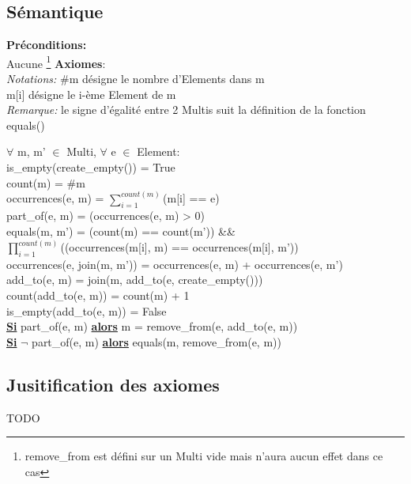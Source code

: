 \documentclass[a4paper, 11pt, oneside]{article}
\begin{document}
	\subsection{Sémantique}
	\noindent \textbf{Préconditions:}
	\\ \indent Aucune \footnote{remove\_from est défini sur un Multi vide mais n'aura aucun effet dans ce cas}
	\clearpage
	\noindent \textbf{Axiomes}:
	\\ \indent \textit{Notations:} \#m désigne le nombre d'Elements dans m 
	\\ \indent \indent \indent \indent \indent m[i] désigne le i-ème Element de m
	\\ \indent \textit{Remarque:} le signe d'égalité entre 2 Multis suit la définition de la fonction equals()
	\begin{spacing}{1.5}
	\indent $\forall$ m, m' $\in$ Multi, $\forall$ e $\in$ Element:
	\\ \indent \indent is\_empty(create\_empty()) = True
	\\ \indent \indent count(m) = \#m
	\\ \indent \indent occurrences(e, m) = $\sum\limits_{i=1}^{count(m)}$(m[i] == e)
	\\ \indent \indent part\_of(e, m) = (occurrences(e, m) > 0)
	\\ \indent \indent equals(m, m') = (count(m) == count(m')) \&\& 
	\\ \indent \indent \indent \indent $\prod\limits_{i=1}^{count(m)}$((occurrences(m[i], m) == occurrences(m[i], m'))
	\\ \indent \indent occurrences(e, join(m, m')) = occurrences(e, m) + occurrences(e, m')
	\\ \indent \indent add\_to(e, m) = join(m, add\_to(e, create\_empty()))
	\\ \indent \indent count(add\_to(e, m)) = count(m) + 1
	\\ \indent \indent is\_empty(add\_to(e, m)) = False	
	\\ \indent \indent \textbf{\underline{Si}} part\_of(e, m) \textbf{\underline{alors}} m = remove\_from(e, add\_to(e, m))
	\\ \indent \indent \textbf{\underline{Si}} $\neg$ part\_of(e, m) \textbf{\underline{alors}} equals(m, remove\_from(e, m))
	\end{spacing}
	
	\subsection{Jusitification des axiomes}
	\color{blue} TODO \color{black}
	
\end{document}
